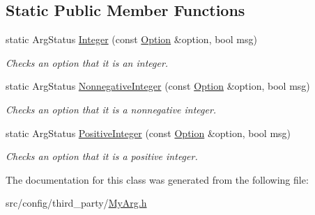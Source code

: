 \subsection*{Static Public Member Functions}
\begin{DoxyCompactItemize}
\item 
\hypertarget{classxmem_1_1config_1_1third__party_1_1_my_arg_aa96164ec393fdb12b359e33ee48e3c64}{}static Arg\+Status \hyperlink{classxmem_1_1config_1_1third__party_1_1_my_arg_aa96164ec393fdb12b359e33ee48e3c64}{Integer} (const \hyperlink{classxmem_1_1config_1_1third__party_1_1_option}{Option} \&option, bool msg)\label{classxmem_1_1config_1_1third__party_1_1_my_arg_aa96164ec393fdb12b359e33ee48e3c64}

\begin{DoxyCompactList}\small\item\em Checks an option that it is an integer. \end{DoxyCompactList}\item 
\hypertarget{classxmem_1_1config_1_1third__party_1_1_my_arg_a51af9350382f12100b5bd6b554c3bcf5}{}static Arg\+Status \hyperlink{classxmem_1_1config_1_1third__party_1_1_my_arg_a51af9350382f12100b5bd6b554c3bcf5}{Nonnegative\+Integer} (const \hyperlink{classxmem_1_1config_1_1third__party_1_1_option}{Option} \&option, bool msg)\label{classxmem_1_1config_1_1third__party_1_1_my_arg_a51af9350382f12100b5bd6b554c3bcf5}

\begin{DoxyCompactList}\small\item\em Checks an option that it is a nonnegative integer. \end{DoxyCompactList}\item 
\hypertarget{classxmem_1_1config_1_1third__party_1_1_my_arg_ad022660b254db34b578eb5b3fc9782a7}{}static Arg\+Status \hyperlink{classxmem_1_1config_1_1third__party_1_1_my_arg_ad022660b254db34b578eb5b3fc9782a7}{Positive\+Integer} (const \hyperlink{classxmem_1_1config_1_1third__party_1_1_option}{Option} \&option, bool msg)\label{classxmem_1_1config_1_1third__party_1_1_my_arg_ad022660b254db34b578eb5b3fc9782a7}

\begin{DoxyCompactList}\small\item\em Checks an option that it is a positive integer. \end{DoxyCompactList}\end{DoxyCompactItemize}


The documentation for this class was generated from the following file\+:\begin{DoxyCompactItemize}
\item 
src/config/third\+\_\+party/\hyperlink{_my_arg_8h}{My\+Arg.\+h}\end{DoxyCompactItemize}
